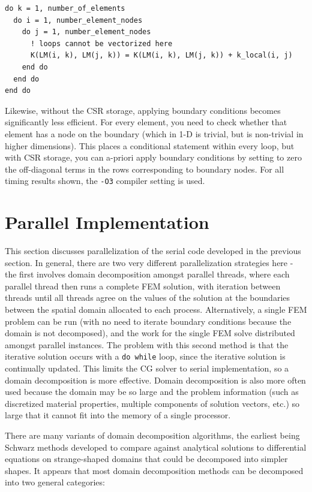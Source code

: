 \documentclass[10pt]{article}
\begin{document}
\begin{lstlisting}
do k = 1, number_of_elements
  do i = 1, number_element_nodes
    do j = 1, number_element_nodes
      ! loops cannot be vectorized here
      K(LM(i, k), LM(j, k)) = K(LM(i, k), LM(j, k)) + k_local(i, j)
    end do
  end do
end do
\end{lstlisting}

Likewise, without the CSR storage, applying boundary conditions becomes significantly less efficient. For every element, you need to check whether that element has a node on the boundary (which in 1-D is trivial, but is non-trivial in higher dimensions). This places a conditional statement within every loop, but with CSR storage, you can a-priori apply boundary conditions by setting to zero the off-diagonal terms in the rows corresponding to boundary nodes. For all timing results shown, the {\tt -O3} compiler setting is used.

\section{Parallel Implementation}
This section discusses parallelization of the serial code developed in the previous section. In general, there are two very different parallelization strategies here - the first involves domain decomposition amongst parallel threads, where each parallel thread then runs a complete FEM solution, with iteration between threads until all threads agree on the values of the solution at the boundaries between the spatial domain allocated to each process. Alternatively, a single FEM problem can be run (with no need to iterate boundary conditions because the domain is not decomposed), and the work for the single FEM solve distributed amongst parallel instances. The problem with this second method is that the iterative solution occurs with a {\tt do while} loop, since the iterative solution is continually updated. This limits the CG solver to serial implementation, so a domain decomposition is more effective. Domain decomposition is also more often used because the domain may be so large and the problem information (such as discretized material properties, multiple components of solution vectors, etc.) so large that it cannot fit into the memory of a single processor. 

There are many variants of domain decomposition algorithms, the earliest being Schwarz methods developed to compare against analytical solutions to differential equations on strange-shaped domains that could be decomposed into simpler shapes. It appears that most domain decomposition methods can be decomposed into two general categories:
\end{document}
